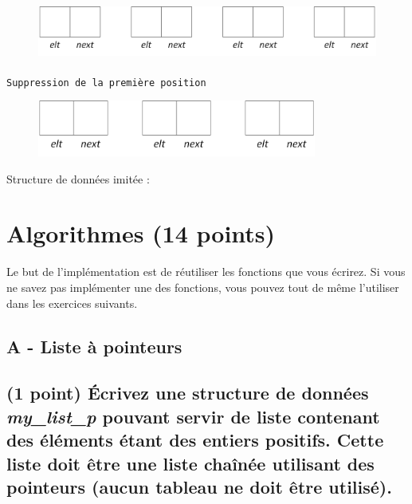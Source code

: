 \documentclass[11pt,a4paper]{article}
\begin{document}
\begin{center}
\begin{figure}[ht!]
\centering
\centerline{  %
\includegraphics[height=1.85cm]{img/Liste_p_vide_4.png}
}
\end{figure}


\texttt{Suppression de la première position}

\begin{figure}[ht!]
\centering
\centerline{  %
\includegraphics[height=1.85cm]{img/Liste_p_vide_3.png}
}
\end{figure}

\bigskip

\end{center}

Structure de données imitée :

\bigskip



\newpage

%
\section{Algorithmes (14 points)}

Le but de l'implémentation est de réutiliser les fonctions que vous écrirez.
Si vous ne savez pas implémenter une des fonctions, vous pouvez tout de même l'utiliser dans les exercices suivants.

\vfillFirst

\subsection*{A - Liste à pointeurs}

\subsection{(1 point) \'Ecrivez une structure de données \og \textit{my\_list\_p} \fg{} pouvant servir de liste contenant des éléments étant des entiers positifs. Cette liste doit être une liste chaînée utilisant des pointeurs (aucun tableau ne doit être utilisé). }
\end{document}
